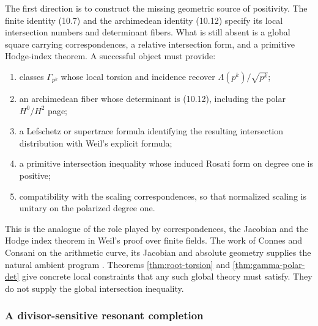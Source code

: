 \documentclass[11pt]{amsart}
\theoremstyle{definition}
\theoremstyle{remark}
\begin{document}
The first direction is to construct the missing geometric source of
positivity.  The finite identity (10.7) and the archimedean identity
(10.12) specify its local intersection numbers and determinant fibers.
What is still absent is a global square carrying correspondences, a
relative intersection form, and a primitive Hodge-index theorem.  A
successful object must provide:
\begin{enumerate}
\item classes \(\Gamma_{p^k}\) whose local torsion and incidence recover
\(\Lambda(p^k)/\sqrt{p^k}\);
\item an archimedean fiber whose determinant is (10.12), including the
polar \(H^0/H^2\) page;
\item a Lefschetz or supertrace formula identifying the resulting
intersection distribution with Weil's explicit formula;
\item a primitive intersection inequality whose induced Rosati form on
degree one is positive;
\item compatibility with the scaling correspondences, so that normalized
scaling is unitary on the polarized degree one.
\end{enumerate}
This is the analogue of the role played by correspondences, the Jacobian
and the Hodge index theorem in Weil's proof over finite fields.  The work of
Connes and Consani on the arithmetic curve, its Jacobian and absolute
geometry supplies the natural ambient program
\cite{CCArch,CCJacobian,CCAbsolute}.  Theorems
\ref{thm:root-torsion} and \ref{thm:gamma-polar-det} give concrete local
constraints that any such global theory must satisfy.  They do not supply
the global intersection inequality.

\subsubsection{A divisor-sensitive resonant completion}
\end{document}

